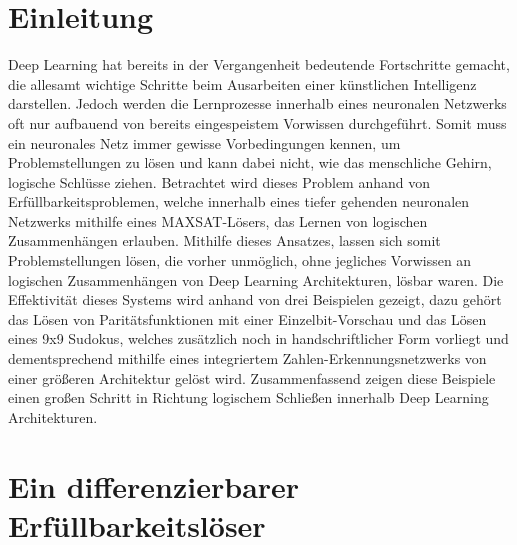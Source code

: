 

\section{Einleitung}
\label{sec:intro}

Deep Learning hat bereits in der Vergangenheit bedeutende Fortschritte gemacht, die allesamt wichtige Schritte beim Ausarbeiten einer künstlichen Intelligenz darstellen. Jedoch werden die Lernprozesse innerhalb eines neuronalen Netzwerks oft nur aufbauend von bereits eingespeistem Vorwissen durchgeführt. Somit muss ein neuronales Netz immer gewisse Vorbedingungen kennen, um Problemstellungen zu lösen und kann dabei nicht, wie das menschliche Gehirn, logische Schlüsse ziehen. Betrachtet wird dieses Problem anhand von Erfüllbarkeitsproblemen, welche innerhalb eines tiefer gehenden neuronalen Netzwerks mithilfe eines MAXSAT-Lösers, das Lernen von logischen Zusammenhängen erlauben. Mithilfe dieses Ansatzes, lassen sich somit Problemstellungen lösen, die vorher unmöglich, ohne jegliches Vorwissen an logischen Zusammenhängen von Deep Learning Architekturen, lösbar waren. Die Effektivität dieses Systems wird anhand von drei Beispielen gezeigt, dazu gehört das Lösen von Paritätsfunktionen mit einer Einzelbit-Vorschau und das Lösen eines 9x9 Sudokus, welches zusätzlich noch in handschriftlicher Form vorliegt und dementsprechend mithilfe eines integriertem Zahlen-Erkennungsnetzwerks von einer größeren Architektur gelöst wird. Zusammenfassend zeigen diese Beispiele einen großen Schritt in Richtung logischem Schließen innerhalb Deep Learning Architekturen. 




\section{Ein differenzierbarer Erfüllbarkeitslöser}
\label{sec:sat}
